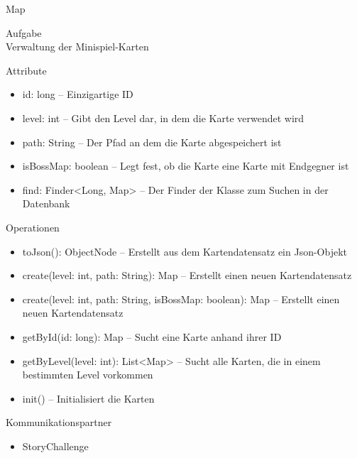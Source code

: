 \newpage
\begin{class}{60}{Map}
\item[Aufgabe]~\\
Verwaltung der Minispiel-Karten
\item[Attribute]~\\
\begin{itemize}
\item id: long -- Einzigartige ID
\item level: int -- Gibt den Level dar, in dem die Karte verwendet wird
\item path: String -- Der Pfad an dem die Karte abgespeichert ist
\item isBossMap: boolean -- Legt fest, ob die Karte eine Karte mit Endgegner ist
\item find: Finder<Long, Map> -- Der Finder der Klasse zum Suchen in der Datenbank
\end{itemize}
\item[Operationen]~\\
\begin{itemize}
\item toJson(): ObjectNode -- Erstellt aus dem Kartendatensatz ein Json-Objekt
\item create(level: int, path: String): Map -- Erstellt einen neuen Kartendatensatz
\item create(level: int, path: String, isBossMap: boolean): Map -- Erstellt einen neuen Kartendatensatz
\item getById(id: long): Map -- Sucht eine Karte anhand ihrer ID
\item getByLevel(level: int): List<Map> -- Sucht alle Karten, die in einem bestimmten Level vorkommen
\item init() -- Initialisiert die Karten
\end{itemize}
\item[Kommunikationspartner]~\\
\begin{itemize}
\item StoryChallenge
\end{itemize}
\end{class}

